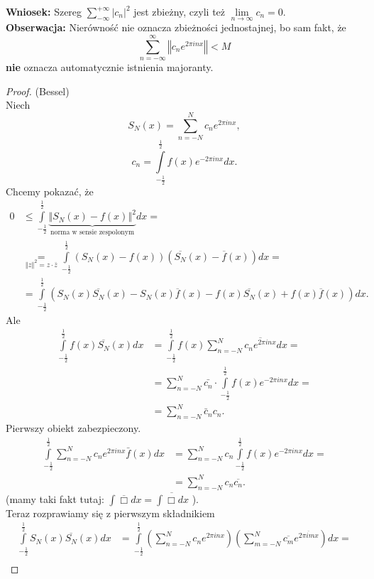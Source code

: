 \documentclass[../main.tex]{subfiles}
\begin{document}
\textbf{Wniosek: }Szereg  $\sum_{-\infty}^{+\infty} |c_n|^2$ jest zbieżny, czyli też $\lim\limits_{n \to \infty}c_n = 0$.\\
\textbf{Obserwacja:} Nierówność nie oznacza zbieżności jednostajnej, bo sam fakt, że
\[
    \sum_{n=-\infty}^{\infty} \left\Vert c_n e^{2\pi i n x} \right\Vert < M
\]
\textbf{nie} oznacza automatycznie istnienia majoranty.
\begin{proof}
    (Bessel)\\
    Niech
    \[
        S_N(x) = \sum_{n=-N}^{N} c_n e^{2\pi i n x}
    ,\]
\[
    c_n = \int\limits_{-\frac{1}{2}}^{\frac{1}{2}} f(x) e^{-2\pi i n x}dx
.\]
Chcemy pokazać, że
\begin{align}
    0 &\le \int\limits_{-\frac{1}{2}}^{\frac{1}{2}} \underbrace{\left\Vert S_N(x) - f(x) \right\Vert^2}_{\text{norma w sensie zespolonym}} dx =\nonumber \\
    & \underset{\left\Vert z \right\Vert^2 = z\cdot \bar{z}}{=} \int\limits_{-\frac{1}{2}}^{\frac{1}{2}} \left( S_N(x) - f(x) \right) \left( \overline{S_N}(x) - \overline{f}(x)  \right)dx =\nonumber \\
    \label{eqn:eq28-2}
    &= \int\limits_{-\frac{1}{2}}^{\frac{1}{2}} \left( S_N(x)\overline{S_N} (x) - S_N(x) \overline{f} (x) - f(x) \overline{S_N} (x) + f(x)\overline{f}(x) \right)  dx \tag{$\star\star$}
.\end{align}
Ale
\begin{align*}
    \int\limits_{-\frac{1}{2}}^{\frac{1}{2}} f(x) \overline{S_N} (x) dx &= \int\limits_{-\frac{1}{2}}^{\frac{1}{2}} f(x) \sum_{n=-N}^{N} \overline{c_n e^{2\pi i n x}} dx =\\
    &= \sum_{n=-N}^{N} \bar{c_n}\cdot \int\limits_{-\frac{1}{2}}^{\frac{1}{2}} f(x) e^{-2\pi i n x}dx =\\
    &= \sum_{n=-N}^{N} \bar{c}_n c_n
.\end{align*}
Pierwszy obiekt zabezpieczony.
\begin{align*}
    \int\limits_{-\frac{1}{2}}^{\frac{1}{2}} \sum_{n=-N}^{N} c_n e^{2\pi i n x}\bar{f}(x) dx &= \sum_{n=-N}^{N} c_n \int\limits_{-\frac{1}{2}}^{\frac{1}{2}} f(x) e^{-2\pi i n x}dx = \\
    &= \sum_{n=-N}^{N} c_n \overline{c_n}
.\end{align*}
    (mamy taki fakt tutaj: $\int \overline{\Box} dx = \overline{\int \Box dx} $ ).\\
    Teraz rozprawiamy się z pierwszym składnikiem
    \begin{align*}
        \int\limits_{-\frac{1}{2}}^{\frac{1}{2}} S_N(x) \overline{S_N} (x) dx &= \int\limits_{-\frac{1}{2}}^{\frac{1}{2}} \left( \sum_{n=-N}^{N} c_n e^{2\pi i n x} \right) \left( \sum_{m=-N}^{N} \overline{c_m}e^{\overline{2\pi i m x} }  \right)dx =\\

\end{align*}
\end{proof}
\end{document}
